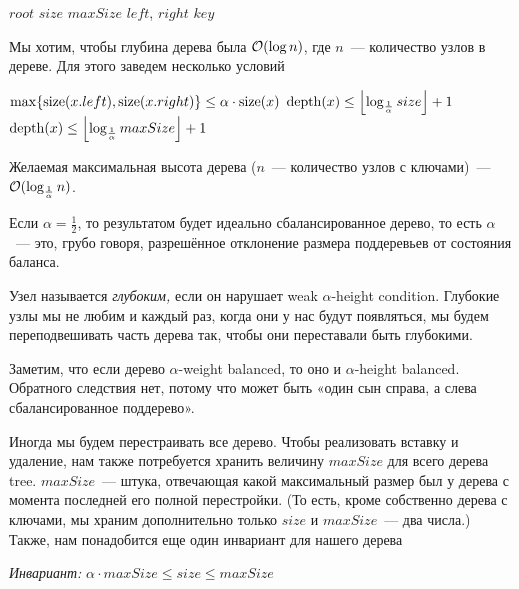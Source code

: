 \begin{algorithmic}[0]
	\algrenewcommand{}
		\State $root$
		\State $size$
		\State $maxSize$
	\EndProcedure
		\State $left$, $right$
		\State $key$
	\EndProcedure
\end{algorithmic}

Мы хотим, чтобы глубина дерева была $\BigO(\log n)$, где $n$~--- количество узлов в дереве. Для этого заведем несколько условий

\begin{algorithmic}[0]
	\algrenewcommand{}
		\State $\max \set*{\size (x.left), \size (x.right)} \leq \alpha \cdot \size (x)$
	\EndProcedure
		\State $\fdepth(x) \leq \floor*{\log_{\frac{1}{\alpha}} size} + 1$
	\EndProcedure
		\State $\fdepth(x) \leq \floor*{\log_{\frac{1}{\alpha}} maxSize} + 1$ 
	\EndProcedure
\end{algorithmic}

Желаемая максимальная высота дерева ($n$~— количество узлов с ключами)~— $\BigO(\log_{\frac{1}{\alpha}} n)$.

Если $\alpha = \frac{1}{2}$, то результатом будет идеально сбалансированное дерево, то есть $\alpha$~--- это, грубо говоря, разрешённое отклонение размера поддеревьев от состояния баланса.

Узел называется {\it глубоким,} если он нарушает weak $\alpha$-height condition. Глубокие узлы мы не любим и каждый раз, когда они у нас будут появляться, мы будем переподвешивать часть дерева так, чтобы они переставали быть глубокими.

Заметим, что если дерево $\alpha$-weight balanced, то оно и $\alpha$-height balanced. Обратного следствия нет, потому что может быть «один сын справа, а слева сбалансированное поддерево».

Иногда мы будем перестраивать все дерево. Чтобы реализовать вставку и удаление, нам также потребуется хранить величину $maxSize$ для всего дерева tree. $maxSize$~— штука, отвечающая какой максимальный размер был у дерева с момента последней его полной перестройки. (То есть, кроме собственно дерева с ключами, мы храним дополнительно только $size$ и $maxSize$~--- два числа.) Также, нам понадобится еще один инвариант для нашего дерева

{\it Инвариант:} $\alpha \cdot maxSize \leq size \leq maxSize$

